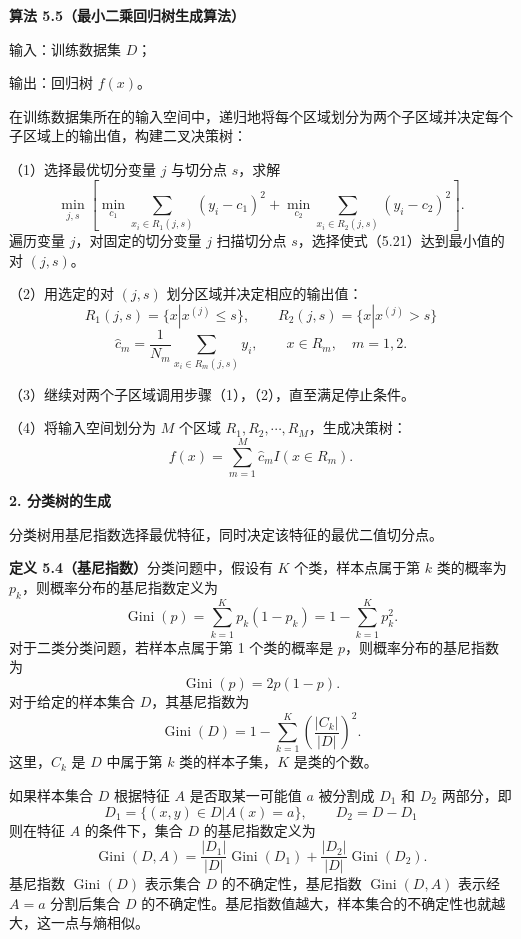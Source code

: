 \documentclass[UTF8, 12pt, fontset=fandol, oneside]{ctexart}
\begin{document}
\noindent\textbf{算法 5.5（最小二乘回归树生成算法）}

输入：训练数据集 $D$；

输出：回归树 $f(x)$。

在训练数据集所在的输入空间中，递归地将每个区域划分为两个子区域并决定每个子区域上的输出值，构建二叉决策树：

（1）选择最优切分变量 $j$ 与切分点 $s$，求解
\begin{equation}
  \min_{j,s}\left[
  \min_{c_1}\sum_{x_i\in R_1(j,s)}(y_i-c_1)^2+
  \min_{c_2}\sum_{x_i\in R_2(j,s)}(y_i-c_2)^2
  \right].
  \tag{5.21}
\end{equation}
遍历变量 $j$，对固定的切分变量 $j$ 扫描切分点 $s$，选择使式（5.21）达到最小值的对 $(j,s)$。

（2）用选定的对 $(j,s)$ 划分区域并决定相应的输出值：
\[
  R_1(j,s)=\{x|x^{(j)}\le s\},\qquad
  R_2(j,s)=\{x|x^{(j)}>s\}
\]
\[
  \hat c_m=\frac{1}{N_m}\sum_{x_i\in R_m(j,s)}y_i,\qquad x\in R_m,\quad m=1,2.
\]

（3）继续对两个子区域调用步骤（1），（2），直至满足停止条件。

（4）将输入空间划分为 $M$ 个区域 $R_1,R_2,\cdots,R_M$，生成决策树：
\[
  f(x)=\sum_{m=1}^{M}\hat c_mI(x\in R_m).
\]

\noindent\textbf{2. 分类树的生成}

分类树用基尼指数选择最优特征，同时决定该特征的最优二值切分点。

\noindent\textbf{定义 5.4（基尼指数）}\quad 分类问题中，假设有 $K$ 个类，样本点属于第 $k$ 类的概率为 $p_k$，则概率分布的基尼指数定义为
\begin{equation}
  \operatorname{Gini}(p)=\sum_{k=1}^{K}p_k(1-p_k)=1-\sum_{k=1}^{K}p_k^2.
  \tag{5.22}
\end{equation}
对于二类分类问题，若样本点属于第 1 个类的概率是 $p$，则概率分布的基尼指数为
\begin{equation}
  \operatorname{Gini}(p)=2p(1-p).
  \tag{5.23}
\end{equation}
对于给定的样本集合 $D$，其基尼指数为
\begin{equation}
  \operatorname{Gini}(D)=1-\sum_{k=1}^{K}\left(\frac{|C_k|}{|D|}\right)^2.
  \tag{5.24}
\end{equation}
这里，$C_k$ 是 $D$ 中属于第 $k$ 类的样本子集，$K$ 是类的个数。

如果样本集合 $D$ 根据特征 $A$ 是否取某一可能值 $a$ 被分割成 $D_1$ 和 $D_2$ 两部分，即
\[
  D_1=\{(x,y)\in D|A(x)=a\},\qquad D_2=D-D_1
\]
则在特征 $A$ 的条件下，集合 $D$ 的基尼指数定义为
\begin{equation}
  \operatorname{Gini}(D,A)=\frac{|D_1|}{|D|}\operatorname{Gini}(D_1)
  +\frac{|D_2|}{|D|}\operatorname{Gini}(D_2).
  \tag{5.25}
\end{equation}
基尼指数 $\operatorname{Gini}(D)$ 表示集合 $D$ 的不确定性，基尼指数 $\operatorname{Gini}(D,A)$ 表示经 $A=a$ 分割后集合 $D$ 的不确定性。基尼指数值越大，样本集合的不确定性也就越大，这一点与熵相似。
\end{document}
